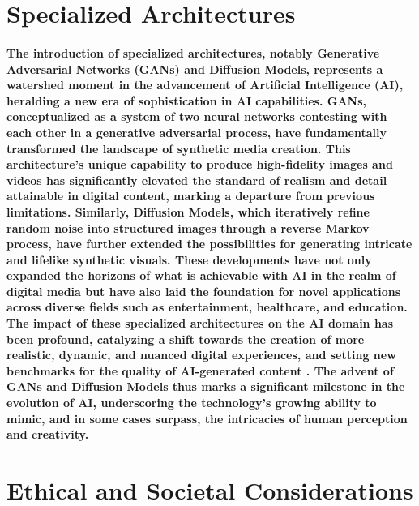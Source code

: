 \documentclass[11pt,a4paper,oneside]{report}
\begin{document}
\section{Specialized Architectures}
\paragraph{The introduction of specialized architectures, notably Generative Adversarial Networks (GANs) and Diffusion Models, represents a watershed moment in the advancement of Artificial Intelligence (AI), heralding a new era of sophistication in AI capabilities. GANs, conceptualized as a system of two neural networks contesting with each other in a generative adversarial process, have fundamentally transformed the landscape of synthetic media creation. This architecture's unique capability to produce high-fidelity images and videos has significantly elevated the standard of realism and detail attainable in digital content, marking a departure from previous limitations. Similarly, Diffusion Models, which iteratively refine random noise into structured images through a reverse Markov process, have further extended the possibilities for generating intricate and lifelike synthetic visuals. These developments have not only expanded the horizons of what is achievable with AI in the realm of digital media but have also laid the foundation for novel applications across diverse fields such as entertainment, healthcare, and education. The impact of these specialized architectures on the AI domain has been profound, catalyzing a shift towards the creation of more realistic, dynamic, and nuanced digital experiences, and setting new benchmarks for the quality of AI-generated content \cite{granot2022drop}. The advent of GANs and Diffusion Models thus marks a significant milestone in the evolution of AI, underscoring the technology's growing ability to mimic, and in some cases surpass, the intricacies of human perception and creativity.}

\section{Ethical and Societal Considerations}
\end{document}
